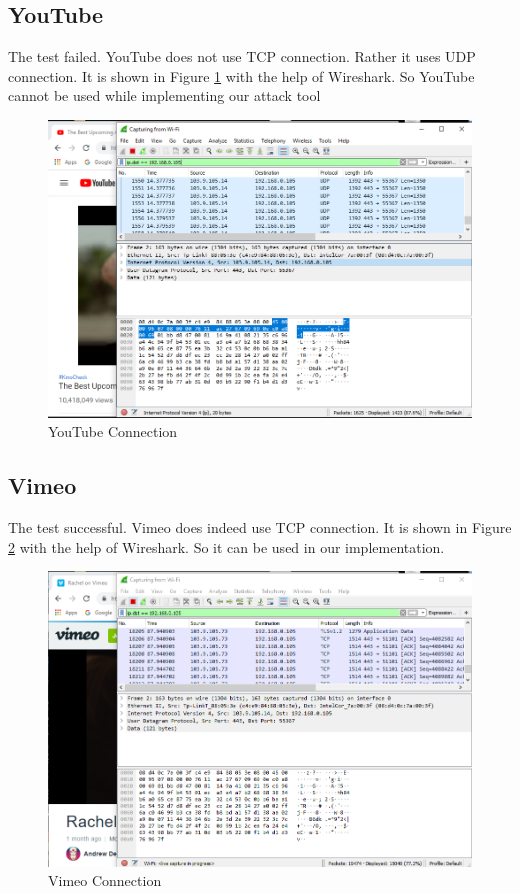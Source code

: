 \documentclass[14pt]{extarticle}
\begin{document}
    \subsection{YouTube}
    The test failed. YouTube does not use TCP connection. Rather it uses UDP connection. It is shown in Figure \ref{fig:youtube} with the help of Wireshark. So YouTube cannot be used while implementing our attack tool
    \begin{figure}[!h]
        \centering
        \includegraphics[width=.95\textwidth]{Pictures/Youtube_test.png}
        \caption{YouTube Connection}
        \label{fig:youtube}
    \end{figure}
    
    
    \subsection{Vimeo}
    The test successful. Vimeo does indeed use TCP connection. It is shown in Figure \ref{fig:vimeo} with the help of Wireshark. So it can be used in our implementation.
    \begin{figure}
        \centering
        \includegraphics[width=.95\textwidth]{Pictures/Vimeo_test.png}
        \caption{Vimeo Connection}
        \label{fig:vimeo}
    \end{figure}
    
\end{document}
